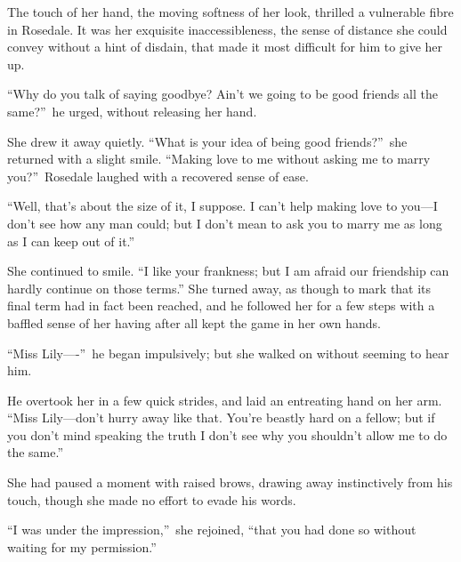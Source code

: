 \documentclass[12pt,a4paper]{book}
\begin{document}
The touch of her hand, the moving softness of her look, thrilled
a vulnerable fibre in Rosedale. It was her exquisite
inaccessibleness, the sense of distance she could convey without
a hint of disdain, that made it most difficult for him to give
her up.





``Why do you talk of saying goodbye? Ain't we going to be good
friends all the same?''\ he urged, without releasing her hand.





She drew it away quietly. ``What is your idea of being good
friends?''\ she returned with a slight smile. ``Making love to me
without asking me to marry you?''\ Rosedale laughed with a
recovered sense of ease.





``Well, that's about the size of it, I suppose. I can't help
making love to you---I don't see how any man could; but I don't
mean to ask you to marry me as long as I can keep out of it.''





She continued to smile. ``I like your frankness; but I am afraid
our friendship can hardly continue on those terms.'' She turned
away, as though to mark that its final term had in fact been
reached, and he followed her for a few steps with a baffled sense
of her having after all kept the game in her own hands.





``Miss Lily----''\ he began impulsively; but she walked on without
seeming to hear him.





He overtook her in a few quick strides, and laid an entreating
hand on her arm. ``Miss Lily---don't hurry away like that. You're
beastly hard on a fellow; but if you don't mind speaking the
truth I don't see why you shouldn't allow me to do the same.''





She had paused a moment with raised brows, drawing away
instinctively from his touch, though she made no effort to evade
his words.





``I was under the impression,''\ she rejoined, ``that you had done so
without waiting for my permission.''
\end{document}
